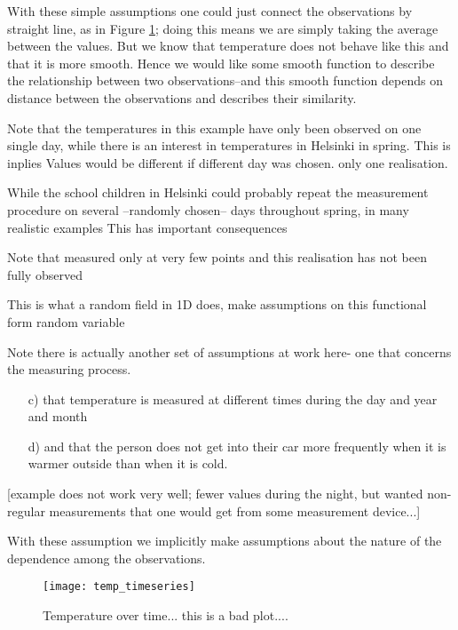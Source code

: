 With these simple assumptions one could just  connect the observations by straight line, as in Figure \ref{fig:ch2:1D}; doing this means we are simply taking the average between the values. But we know that temperature does not behave like this and that it is more smooth. Hence we would like some smooth function to describe the relationship between two observations--and this smooth function depends on distance between the observations and describes their similarity.

Note that the temperatures in this example have only been observed on one single day, while there is an interest in temperatures in Helsinki in spring. This is inplies  Values would be different if different day was chosen. 
only one realisation.


While the school children in Helsinki could probably repeat the measurement procedure on several  --randomly chosen-- days throughout spring, in many realistic examples This has important consequences 

Note that measured only at very few points
and this realisation has not been fully observed

This is what a random field in 1D does, make assumptions on this functional form
random variable 





Note there is actually another set of assumptions at work here- one that concerns the measuring process.
\begin{itemize}
\item[c)] that temperature is measured at different times during the day and year and month  
\item[d)] and that the person does not get into their car more frequently when it is warmer outside than when it is cold.
\end{itemize}
[example does not work very well; fewer values during the night, but wanted non-regular measurements that one would get from some measurement device...]



With these assumption we implicitly make assumptions about the nature of the dependence among the observations.


\begin{figure}
\centering
\texttt{[image: temp\_timeseries]}
\caption{\label{fig:ch2:1D} Temperature over time... this is a bad plot....}
\end{figure}


